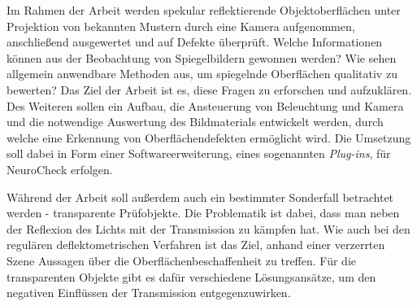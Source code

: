 Im Rahmen der Arbeit werden spekular reflektierende Objektoberflächen unter Projektion von bekannten Mustern durch eine Kamera aufgenommen, anschließend ausgewertet und auf Defekte überprüft.
Welche Informationen können aus der Beobachtung von Spiegelbildern gewonnen werden?
Wie sehen allgemein anwendbare Methoden aus, um spiegelnde Oberflächen qualitativ zu bewerten?
Das Ziel der Arbeit ist es, diese Fragen zu erforschen und aufzuklären.
Des Weiteren sollen ein Aufbau, die Ansteuerung von Beleuchtung und Kamera und die notwendige Auswertung des Bildmaterials entwickelt werden, durch welche eine Erkennung von Oberflächendefekten ermöglicht wird.
Die Umsetzung soll dabei in Form einer Softwareerweiterung, eines sogenannten \textit{Plug-ins}, für NeuroCheck erfolgen.

\p
Während der Arbeit soll außerdem auch ein bestimmter Sonderfall betrachtet werden - transparente Prüfobjekte.
Die Problematik ist dabei, dass man neben der Reflexion des Lichts mit der Transmission zu kämpfen hat.
Wie auch bei den regulären deflektometrischen Verfahren ist das Ziel, anhand einer verzerrten Szene Aussagen über die Oberflächenbeschaffenheit zu treffen.
Für die transparenten Objekte gibt es dafür verschiedene Lösungsansätze, um den negativen Einflüssen der Transmission entgegenzuwirken.